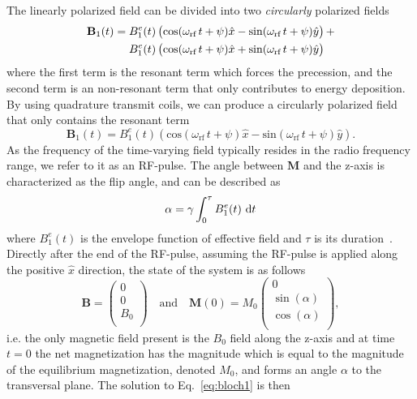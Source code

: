 The linearly polarized field can be divided into two \emph{circularly} polarized fields
\begin{align}
  \textbf{B}_1(t) = B_1^e(t)\left(\textrm{cos}(\omega_{\textrm{rf}}\, t+\psi)\hat x - \textrm{sin}(\omega_{\textrm{rf}}\, t+\psi)\hat y \right) +
  \notag\\
     B_1^e(t)\left(\textrm{cos}(\omega_{\textrm{rf}}\, t+\psi)\hat x + \textrm{sin}(\omega_{\textrm{rf}}\, t+\psi)\hat y \right) \phantom{+}
\end{align}
where the first term is the resonant term which forces the precession, and the second term is an non-resonant term that only contributes to energy deposition. By using quadrature transmit coils, we can produce a circularly polarized field that only contains the resonant term
\begin{equation}
    \textbf{B}_1(t) = B_1^e(t)\left(\textrm{cos}(\omega_{\textrm{rf}}\, t+\psi)\hat x - \textrm{sin}(\omega_{\textrm{rf}}\, t+\psi)\hat y\right).
\end{equation}
As the frequency of the time-varying field typically resides in the radio frequency range, we refer to it as an RF-pulse. The angle between $\textbf{M}$ and the z-axis is characterized as the flip angle, and can be described as
\begin{equation}
    \label{eq:fa}
    \alpha = \gamma\int_0^\tau B_1^e(t)\,\dif t
\end{equation}
where $B_1^e(t)$ is the envelope function of effective field and $\tau$ is its duration~\cite{Bernstein2004}. Directly after the end of the RF-pulse, assuming the RF-pulse is applied along the positive $\hat x$ direction, the state of the system is as follows
\begin{equation}
	\textbf{B} =
	\begin{pmatrix}
		0\\0\\B_0\\
	\end{pmatrix}
\quad
\textrm{and}
\quad
	\textbf{M}(0) = M_0
	\begin{pmatrix}
		0\\\sin(\alpha)\\\cos(\alpha)\\
	\end{pmatrix},
\end{equation}
i.e. the only magnetic field present is the $B_0$ field along the z-axis and at time $t = 0$ the net magnetization has the magnitude which is equal to the magnitude of the equilibrium magnetization, denoted $M_0$, and forms an angle $\alpha$ to the transversal plane. The solution to Eq.~\eqref{eq:bloch1} is then
